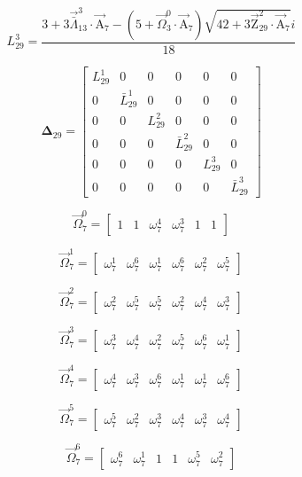 \documentclass{article}
\begin{document}
\begin{enumerate}
\[ L_{29}^{3}=\frac{3+3\vec{\bar{\Lambda}}_{13}^{3}\cdot\vec{\mathrm{A}}_{7}-\left( 5+\vec{\Omega}_{3}^{0}\cdot\vec{\mathrm{A}}_{7} \right)\sqrt{42+3\vec{\mathrm{Z}}_{29}^{2}\cdot\vec{\mathrm{A}}_{7}}i}{18} \]

\[ \boldsymbol{\Delta}_{29}=\left[ \begin{matrix} L_{29}^{1} & 0 & 0 & 0 & 0 & 0 \\ 0 & \bar{L}_{29}^{1} & 0 & 0 & 0 & 0 \\ 0 & 0 & L_{29}^{2} & 0 & 0 & 0 \\ 0 & 0 & 0 & \bar{L}_{29}^{2} & 0 & 0 \\ 0 & 0 & 0 & 0 & L_{29}^{3} & 0 \\ 0 & 0 & 0 & 0 & 0 & \bar{L}_{29}^{3} \end{matrix} \right] \]

\[ \vec{\Omega}_{7}^{0}=\left[ \begin{matrix} 1 & 1 & \omega_{7}^{4} & \omega_{7}^{3} & 1 & 1 \end{matrix} \right] \]

\[ \vec{\Omega}_{7}^{1}=\left[ \begin{matrix} \omega_{7}^{1} & \omega_{7}^{6} & \omega_{7}^{1} & \omega_{7}^{6} & \omega_{7}^{2} & \omega_{7}^{5} \end{matrix} \right] \]

\[ \vec{\Omega}_{7}^{2}=\left[ \begin{matrix} \omega_{7}^{2} & \omega_{7}^{5} & \omega_{7}^{5} & \omega_{7}^{2} & \omega_{7}^{4} & \omega_{7}^{3} \end{matrix} \right] \]

\[ \vec{\Omega}_{7}^{3}=\left[ \begin{matrix} \omega_{7}^{3} & \omega_{7}^{4} & \omega_{7}^{2} & \omega_{7}^{5} & \omega_{7}^{6} & \omega_{7}^{1} \end{matrix} \right] \]

\[ \vec{\Omega}_{7}^{4}=\left[ \begin{matrix} \omega_{7}^{4} & \omega_{7}^{3} & \omega_{7}^{6} & \omega_{7}^{1} & \omega_{7}^{1} & \omega_{7}^{6} \end{matrix} \right] \]

\[ \vec{\Omega}_{7}^{5}=\left[ \begin{matrix} \omega_{7}^{5} & \omega_{7}^{2} & \omega_{7}^{3} & \omega_{7}^{4} & \omega_{7}^{3} & \omega_{7}^{4} \end{matrix} \right] \]

\[ \vec{\Omega}_{7}^{6}=\left[ \begin{matrix} \omega_{7}^{6} & \omega_{7}^{1} & 1 & 1 & \omega_{7}^{5} & \omega_{7}^{2} \end{matrix} \right] \]

\end{enumerate}
\end{document}
